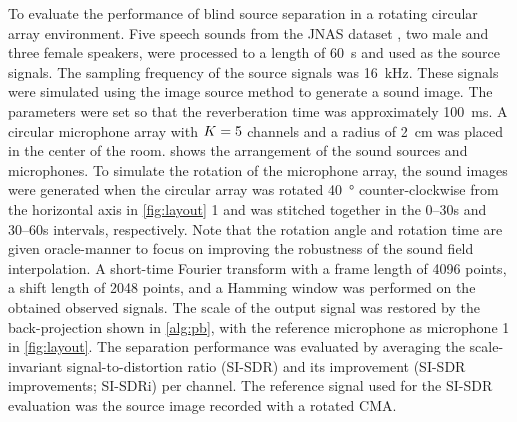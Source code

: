 \documentclass[sip,biber]{now-journal}
\begin{document}
To evaluate the performance of blind source separation in a rotating circular array environment.
Five speech sounds from the JNAS dataset \cite{Itou:1999:AST}, two male and three female speakers, were processed to a length of \SI{60}{\second} and used as the source signals.
The sampling frequency of the source signals was \SI{16}{\kilo\hertz}.
These signals were simulated using the image source method \cite{Allen:1979:JASA} to generate a sound image.
The parameters were set so that the reverberation time was approximately \SI{100}{\milli\second}.
A circular microphone array with $K = 5$ channels and a radius of \SI{2}{\centi\metre} was placed in the center of the room.
 shows the arrangement of the sound sources and microphones.
To simulate the rotation of the microphone array, the sound images were generated when the circular array was rotated \SI{40}{\degree} counter-clockwise from the horizontal axis in \cref{fig:layout} 1 and was stitched together in the 0--30\si{\second} and 30--60\si{\second} intervals, respectively.
Note that the rotation angle and rotation time are given oracle-manner to focus on improving the robustness of the sound field interpolation.
A short-time Fourier transform with a frame length of 4096 points, a shift length of 2048 points, and a Hamming window was performed on the obtained observed signals.
The scale of the output signal was restored by the back-projection shown in \cref{alg:pb}, with the reference microphone as microphone 1 in \cref{fig:layout}.
The separation performance was evaluated by averaging the scale-invariant signal-to-distortion ratio (SI-SDR) \cite{LeRoux:2019:ICASSP} and its improvement (SI-SDR improvements; SI-SDRi) per channel.
The reference signal used for the SI-SDR evaluation was the source image recorded with a rotated CMA.
\end{document}
